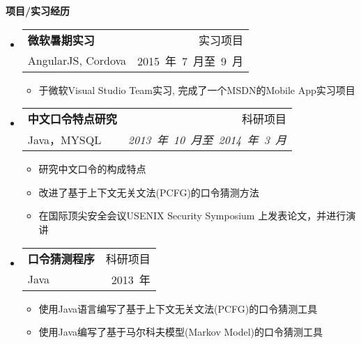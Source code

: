 \documentclass[letterpaper,10pt]{article}
\makeatletter
\newcommand{\resitem}[1]{\item #1 \vspace{-2pt}}
\newcommand{\resheading}[1]{{\large \colorbox{mygrey}{\begin{minipage}{\textwidth}{\textbf{#1 \vphantom{p\^{E}}}}\end{minipage}}}}
\newcommand{\ressubheading}[4]{
\begin{tabular*}{6.5in}{l@{\extracolsep{\fill}}r}
		\textbf{#1} & #2 \\
		#3 & #4 \\
\end{tabular*}\vspace{-6pt}}
\makeatother
\begin{document}
\resheading{项目/实习经历}
	\begin{itemize}
		\item 
			\ressubheading{微软暑期实习}{实习项目}{AngularJS, Cordova}{2015~年~7~月至~9~月}
			{\begin{itemize}
				\resitem {于微软Visual Studio Team实习, 完成了一个MSDN的Mobile App实习项目}
			\end{itemize}}

	\end{itemize}
	\begin{itemize}
		\item
			\ressubheading{中文口令特点研究}{科研项目}{Java，MYSQL}{\emph{2013~年~10~月至~2014~年~3~月}}
			{\begin{itemize}
				\resitem{研究中文口令的构成特点}
                \resitem{改进了基于上下文无关文法(PCFG)的口令猜测方法}
				\resitem{在国际顶尖安全会议USENIX Security Symposium 上发表论文，并进行演讲}
			\end{itemize}
			}	
	\end{itemize}
	\begin{itemize}
		\item 
			\ressubheading{口令猜测程序}{科研项目}{Java}{2013~年}
			{\begin{itemize}
				\resitem{使用Java语言编写了基于上下文无关文法(PCFG)的口令猜测工具}
				\resitem{使用Java编写了基于马尔科夫模型(Markov Model)的口令猜测工具}
			\end{itemize}
			}
	\end{itemize}
\end{document}
